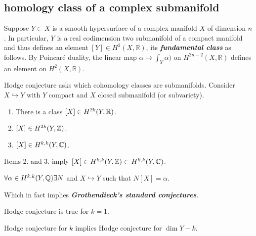 \subsection{homology class of a complex submanifold}

\begin{remark}[2.3.11, Huybrechts]
	Suppose $Y\subset X$ is a smooth hypersurface of a complex manifold $X$ of dimension $n$. In particular, $Y$ is a real codimension two submanifold of a compact manifold and thus defines an element $[Y]\in H^{2}(X,\mathbb{R})$, its \textit{\textbf{fundamental class}} as follows. By Poincar\'e duality, the linear map $\alpha\mapsto \int_{Y}\alpha)$ on $H^{2n-2}(X,\mathbb{R})$ defines an element on $H^{2}(X,\mathbb{R})$.
\end{remark}

Hodge conjecture asks which cohomology classes are submanifolds. Consider $X\hookrightarrow Y$ with $Y$ compact and $X$ closed submanifold (or subvariety).

\begin{enumerate}
	\item There is a class $[X]\in H^{2k}(Y,\mathbb{R})$.
	\item $[X]\in H^{2k}(Y,\mathbb{Z})$.
	\item $[X]\in H^{k,k}(Y,\mathbb{C})$.
\end{enumerate}
Items 2. and 3. imply $[X]\in H^{k,k}(Y,\mathbb{Z})\subset H^{k,k}(Y,\mathbb{C})$.
\begin{conjecture}[Hodge]
	
	$\forall\alpha\in H^{k,k}(Y,\mathbb{Q})\exists N$ and $X\hookrightarrow Y$ such that $N[X]=\alpha$.
\end{conjecture}
Which in fact implies \textbf{\textit{Grothendieck's standard conjectures}}.
\begin{thm}
	Hodge conjecture is true for $k=1$.
\end{thm}
\begin{thm}
	Hodge conjecture for $k$ implies Hodge conjecture for $\dim Y-k$.
\end{thm}
